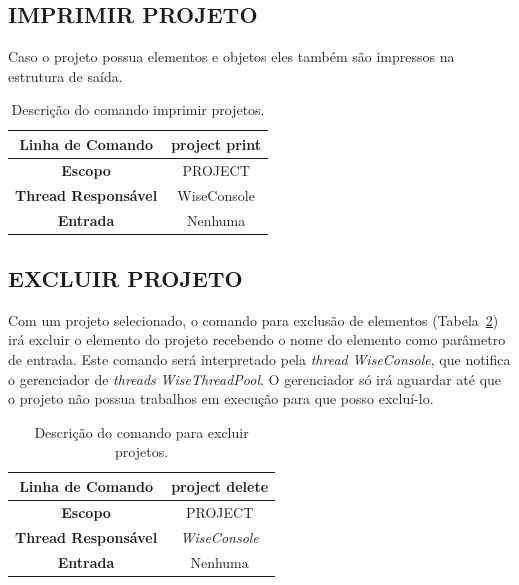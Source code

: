 \subsection{IMPRIMIR PROJETO}\label{sec:print_projects}

 Caso o projeto possua elementos e objetos eles também são impressos na estrutura de saída.

\begin{center}
	\begin{table}[!htbp]
		\begin{tabularx}{\textwidth}{c|X}
			\toprule
			\textbf{Linha de Comando} & \multicolumn{1}{c}{project print} \\
			\midrule
			\textbf{Escopo} & \multicolumn{1}{c}{PROJECT} \\
			\hline
			\textbf{Thread Responsável} & \multicolumn{1}{c}{WiseConsole} \\
			\hline
			\textbf{Entrada} & \multicolumn{1}{c}{Nenhuma} \\
			\bottomrule
		\end{tabularx}
		\caption{Descrição do comando imprimir projetos.}
		\label{tab:print_projects}
	\end{table}
\end{center}

\subsection{EXCLUIR PROJETO}\label{sec:delete_projects}

Com um projeto selecionado, o comando para exclusão de elementos (Tabela~\ref{tab:delete_projects}) irá excluir o elemento do projeto recebendo o nome do elemento como parâmetro de entrada. Este comando será interpretado pela \textit{thread} \textit{WiseConsole}, que notifica o gerenciador de \textit{threads} \textit{WiseThreadPool}. O gerenciador só irá aguardar até que o projeto não possua trabalhos em execução para que posso excluí-lo.

\begin{center}
	\begin{table}[!htbp]
		\begin{tabularx}{\textwidth}{c|c}
			\toprule
			\textbf{Linha de Comando} & project delete \\
			\midrule
			\textbf{Escopo} & PROJECT \\
			\hline
			\textbf{Thread Responsável} & \textit{WiseConsole} \\
			\hline
			\textbf{Entrada} & Nenhuma \\
			\bottomrule
		\end{tabularx}
		\caption{Descrição do comando para excluir projetos.}
		\label{tab:delete_projects}
	\end{table}
\end{center}

